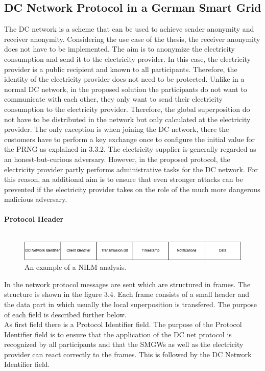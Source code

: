 \subsection{DC Network Protocol in a German Smart Grid}
The DC network is a scheme that can be used to achieve sender anonymity and receiver anonymity. Considering the use case of the thesis, the receiver anonymity does not have to be implemented. The aim is to anonymize the electricity consumption and send it to the electricity provider. In this case, the electricity provider is a public recipient and known to all participants. Therefore, the identity of the electricity provider does not need to be protected. Unlike in a normal DC network, in the proposed solution the participants do not want to communicate with each other, they only want to send their electricity consumption to the electricity provider. Therefore, the global superposition do not have to be distributed in the network but only calculated at the electricity provider. The only exception is when joining the DC network, there the customers have to perform a key exchange once to configure the initial value for the PRNG as explained in 3.3.2. The electricity supplier is generally regarded as an honest-but-curious adversary. However, in the proposed protocol, the electricity provider partly performs administrative tasks for the DC network. For this reason, an additional aim is to ensure that even stronger attacks can be prevented if the electricity provider takes on the role of the much more dangerous malicious adversary. \\
\\
\textbf{Protocol Header}
\\
\\\begin{figure}[tbp]
  \centering
  \includegraphics[width=1\textwidth]{images/Header.png}
  \caption[Short description]{An example of a NILM analysis.}
  \label{fig:Appliance_Model}
\end{figure}In the network protocol messages are sent which are structured in frames. The structure is shown in the figure 3.4. Each frame consists of a small header and the data part in which usually the local superposition is transfered. The purpose of each field is described further below.\\
As first field there is a Protocol Identifier field. The purpose of the Protocol Identifier field is to ensure that the application of the DC net protocol is recognized by all participants and that the SMGWs as well as the electricity provider can react correctly to the frames. This is followed by the DC Network Identifier field.%
